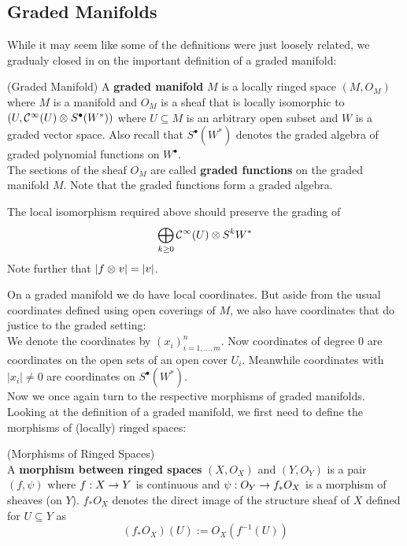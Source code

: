 \newpage
\subsection{Graded Manifolds}

While it may seem like some of the definitions were just loosely related, we gradualy closed in on the important definition of a graded manifold:

\begin{definition} (Graded Manifold)
  A \textbf{graded manifold} $M$ is a locally ringed space $(M, O_M)$ where $M$ is a manifold and $O_M$ is a sheaf that is locally isomorphic to $(U, \mathcal{C}^{\infty}(U) \mathbin{\mathop{\otimes}\displaylimits_{}} S^\bullet(W^*))$ where $U\subseteq M$ is an arbitrary open subset and $W$ is a graded vector space. Also recall that $S^\bullet(W^*)$ denotes the graded algebra of graded polynomial functions on $W^\bullet$.\\

  The sections of the sheaf $O_M$ are called \textbf{graded functions} on the graded manifold $M$. Note that the graded functions form a graded algebra.
\end{definition}

\begin{rem}
  The local isomorphism required above should preserve the grading of
  $$ \bigoplus_{k \geq 0} \mathcal{C}^{\infty}(U) \mathbin{\mathop{\otimes}\displaylimits_{}} S^k W^*$$
  Note further that $|f  \mathbin{\mathop{\otimes}\displaylimits_{}} v| = |v|$.
\end{rem}

On a graded manifold we do have local coordinates. But aside from the usual coordinates defined using open coverings of $M$, we also have coordinates that do justice to the graded setting:\\

We denote the coordinates by $(x_i)^n_{i= 1,...,m}$. Now coordinates of degree $0$ are coordinates on the open sets of an open cover $U_i$. Meanwhile coordinates with $|x_i| \neq 0$ are coordinates on $S^\bullet(W^*)$.\\

Now we once again turn to the respective morphisms of graded manifolds. Looking at the definition of a graded manifold, we first need to define the morphisms of (locally) ringed spaces:

\begin{definition} (Morphisms of Ringed Spaces)\\
  A \textbf{morphism between ringed spaces} $(X,O_X)$ and $(Y,O_Y)$ is a pair $(f, \psi)$ where $f:X\rightarrow Y$ is continuous and $\psi:O_Y \rightarrow f_* O_X$
  is a morphism of sheaves (on $Y$). $f_* O_X$ denotes the direct image of the structure sheaf of $X$ defined for $U\subseteq Y$ as
  $$ (f_* O_X)(U) := O_X(f^{-1}(U)) $$
\end{definition}

